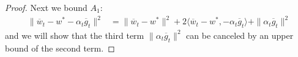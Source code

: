 \begin{proof}
		Next we bound $A_{1}$: 
		\begin{align*}
		\|\overline{w}_{t}-w^{\ast}-\alpha_{t}\overline{g}_{t}\|^{2} & =\|\overline{w}_{t}-w^{\ast}\|^{2}+2\langle\overline{w}_{t}-w^{\ast},-\alpha_{t}\overline{g}_{t}\rangle+\|\alpha_{t}\overline{g}_{t}\|^{2}
		\end{align*}
		and we will show that the third term $\|\alpha_{t}\overline{g}_{t}\|^{2}$
		can be canceled by an upper bound of the second term. %
		\begin{comment}
		The last term is straightforward to bound by the convexity of $\|\cdot\|^{2}$
		and $L$-smoothness of $F_{k}$,
		\begin{align*}
		\alpha_{t}^{2}\|\overline{g}_{t}\|^{2} & \leq\alpha_{t}^{2}\sum_{k=1}^{N}p_{k}\|\nabla F_{k}(w_{t}^{k})\|^{2}\leq2L\alpha_{t}^{2}\sum_{k=1}^{N}p_{k}(F_{k}(w_{t}^{k})-F_{k}^{\ast})
		\end{align*}
		or 
		\begin{align*}
		\alpha_{t}^{2}\|\overline{g}_{t}\|^{2} & \leq\alpha_{t}^{2}\sum_{k=1}^{N}p_{k}\|\nabla F_{k}(w_{t}^{k})\|^{2}\leq\alpha_{t}^{2}\sum_{k=1}^{N}p_{k}\mathbb{E}\|\nabla F_{k}(w_{t}^{k},\xi_{t}^{k})\|^{2}\leq\alpha_{t}^{2}G^{2}
		\end{align*}
		\end{comment}
		

\end{proof}
